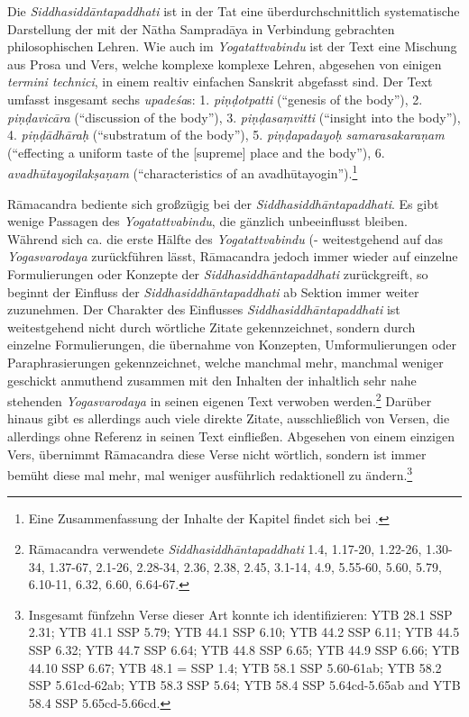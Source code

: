 Die \emph{Siddhasiddāntapaddhati} ist in der Tat eine überdurchschnittlich systematische Darstellung der mit der Nātha Sampradāya in Verbindung gebrachten philosophischen Lehren. Wie auch im \emph{Yogatattvabindu} ist der Text eine Mischung aus Prosa und Vers, welche komplexe komplexe Lehren, abgesehen von einigen \textit{termini technici}, in einem realtiv einfachen Sanskrit abgefasst sind. Der Text umfasst insgesamt sechs \textit{upadeśa}s: 1. \textit{piṇḍotpatti} (``genesis of the body''), 2. \textit{piṇḍavicāra} (``discussion of the body''), 3. \textit{piṇḍasaṃvitti} (``insight into the body''), 4. \textit{piṇḍādhāraḥ} (``substratum of the body''), 5. \textit{piṇḍapadayoḥ samarasakaraṇam} (``effecting a uniform taste of the [supreme] place and the body''), 6. \textit{avadhūtayogilakṣaṇam} (``characteristics of an avadhūtayogin'').\footnote{Eine Zusammenfassung der Inhalte der Kapitel findet sich bei \citeauthor[2016: -]{ssplonavla}.}

Rāmacandra bediente sich großzügig bei der \emph{Siddhasiddhāntapaddhati}. Es gibt wenige Passagen des \emph{Yogatattvabindu}, die gänzlich unbeeinflusst bleiben. Während sich ca. die erste Hälfte des \emph{Yogatattvabindu} (- weitestgehend auf das \emph{Yogasvarodaya} zurückführen lässt, Rāmacandra jedoch immer wieder auf einzelne Formulierungen oder Konzepte der \emph{Siddhasiddhāntapaddhati} zurückgreift, so beginnt der Einfluss der \emph{Siddhasiddhāntapaddhati} ab Sektion  immer weiter zuzunehmen. Der Charakter des Einflusses \emph{Siddhasiddhāntapaddhati} ist weitestgehend nicht durch wörtliche Zitate gekennzeichnet, sondern durch einzelne Formulierungen, die übernahme von Konzepten, Umformulierungen oder Paraphrasierungen gekennzeichnet, welche manchmal mehr, manchmal weniger geschickt anmuthend zusammen mit den Inhalten der inhaltlich sehr nahe stehenden \emph{Yogasvarodaya} in seinen eigenen Text verwoben werden.\footnote{Rāmacandra verwendete \emph{Siddhasiddhāntapaddhati} 1.4, 1.17-20, 1.22-26, 1.30-34, 1.37-67, 2.1-26, 2.28-34, 2.36, 2.38, 2.45, 3.1-14, 4.9, 5.55-60, 5.60, 5.79, 6.10-11, 6.32, 6.60, 6.64-67.} Darüber hinaus gibt es allerdings auch viele direkte Zitate, ausschließlich von Versen, die allerdings ohne Referenz in seinen Text einfließen. Abgesehen von einem einzigen Vers, übernimmt Rāmacandra diese Verse nicht wörtlich, sondern ist immer bemüht diese mal mehr, mal weniger ausführlich redaktionell zu ändern.\footnote{Insgesamt fünfzehn Verse dieser Art konnte ich identifizieren: YTB 28.1 \approx SSP 2.31; YTB 41.1 \approx SSP 5.79; YTB 44.1 \approx SSP 6.10; YTB 44.2 \approx SSP 6.11; YTB 44.5 \approx SSP 6.32; YTB 44.7 \approx SSP 6.64; YTB 44.8 \approx SSP 6.65; YTB 44.9 \approx SSP 6.66; YTB 44.10 \approx SSP 6.67; YTB 48.1 = SSP 1.4; YTB 58.1 \approx SSP 5.60-61ab; YTB 58.2 \approx SSP 5.61cd-62ab; YTB 58.3 \approx SSP 5.64; YTB 58.4 \approx SSP 5.64cd-5.65ab and YTB 58.4 \approx SSP 5.65cd-5.66cd.}

